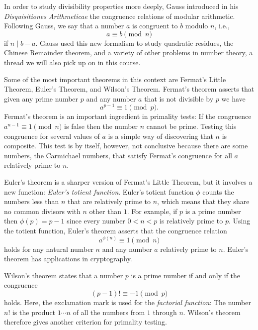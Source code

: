 \documentclass{article}
\theoremstyle{definition}
\theoremstyle{remark}
\begin{document}
In order to study divisibility properties more deeply, Gauss introduced in his \emph{Disquisitiones Arithmeticae} the congruence relations of modular arithmetic. Following Gauss, we say that a number $a$ is congruent to $b$ modulo $n$, i.e.,
\begin{equation*}
  a \equiv b \pmod{n}
\end{equation*}
if $n \mid b - a$. Gauss used this new formalism to study quadratic residues, the Chinese Remainder theorem, and a variety of other problems in number theory, a thread we will also pick up on in this course.

Some of the most important theorems in this context are Fermat's Little Theorem, Euler's Theorem, and Wilson's Theorem. Fermat's theorem asserts that given any prime number $p$ and any number $a$ that is not divisible by $p$ we have
\begin{equation*}
  a^{p-1}\equiv 1 \pmod{p}.
\end{equation*}
Fermat's theorem is an important ingredient in primality tests: If the congruence $a^{n-1}\equiv 1 \pmod{n}$ is false then the number $n$ cannot be prime. Testing this congruence for several values of $a$ is a simple way of discovering that $n$ is composite. This test is by itself, however, not conclusive because there are some numbers, the Carmichael numbers, that satisfy Fermat's congruence for all $a$ relatively prime to $n$.

Euler's theorem is a sharper version of Fermat's Little Theorem, but it involves a new function: \emph{Euler's totient function}. Euler's totient function $\phi$ counts the numbers less than $n$ that are relatively prime to $n$, which means that they share no common divisors with $n$ other than $1$. For example, if $p$ is a prime number then $\phi(p)=p-1$ since every number $0<n<p$ is relatively prime to $p$. Using the totient function, Euler's theorem asserts that the congruence relation
\begin{equation*}
  a^{\phi(n)}\equiv 1 \pmod{n}
\end{equation*}
holds for any natural number $n$ and any number $a$ relatively prime to $n$. Euler's theorem has applications in cryptography.

Wilson's theorem states that a number $p$ is a prime number if and only if the congruence
\begin{equation*}
  (p-1)!\equiv -1 \pmod{p}
\end{equation*}
holds. Here, the exclamation mark is used for the \emph{factorial function}: The number $n!$ is the product $1\cdots n$ of all the numbers from $1$ through $n$. Wilson's theorem therefore gives another criterion for primality testing.
\end{document}
